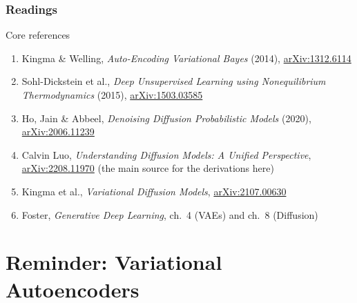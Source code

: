 \documentclass{beamer}
\begin{document}
\begin{frame}
\frametitle{Readings}
\begin{block}{Core references}
\begin{enumerate}
  \item Kingma \& Welling, \emph{Auto-Encoding Variational Bayes} (2014),
        \href{https://arxiv.org/abs/1312.6114}{arXiv:1312.6114}
  \item Sohl-Dickstein et al., \emph{Deep Unsupervised Learning using
        Nonequilibrium Thermodynamics} (2015),
        \href{https://arxiv.org/abs/1503.03585}{arXiv:1503.03585}
  \item Ho, Jain \& Abbeel, \emph{Denoising Diffusion Probabilistic Models}
        (2020), \href{https://arxiv.org/abs/2006.11239}{arXiv:2006.11239}
  \item Calvin Luo, \emph{Understanding Diffusion Models: A Unified Perspective},
        \href{https://arxiv.org/abs/2208.11970}{arXiv:2208.11970} (the main source
        for the derivations here)
  \item Kingma et al., \emph{Variational Diffusion Models},
        \href{https://arxiv.org/abs/2107.00630}{arXiv:2107.00630}
  \item Foster, \emph{Generative Deep Learning}, ch.\ 4 (VAEs) and ch.\ 8 (Diffusion)
\end{enumerate}
\end{block}
\end{frame}

\section{Reminder: Variational Autoencoders}
\end{document}
